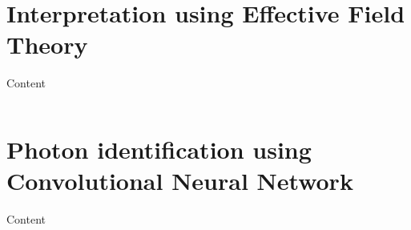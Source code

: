 \documentclass[10pt,aspectratio=169]{beamer}
\begin{document}


\section{Interpretation using Effective Field Theory}

\begin{frame}{Content}
\label{content}
    \begin{columns}[t]
        \begin{column}{.5\textwidth}
            \tableofcontents[sections={1-5},currentsection]
        \end{column}
        \begin{column}{.5\textwidth}
            \tableofcontents[sections={6-},currentsection]
        \end{column}
    \end{columns}
\end{frame}



{
\begin{frame}
\end{frame}
}

\section{Photon identification using Convolutional Neural Network}

\begin{frame}{Content}
\label{content}
    \begin{columns}[t]
        \begin{column}{.5\textwidth}
            \tableofcontents[sections={1-5},currentsection]
        \end{column}
        \begin{column}{.5\textwidth}
            \tableofcontents[sections={6-},currentsection]
        \end{column}
    \end{columns}
\end{frame}
\end{document}
